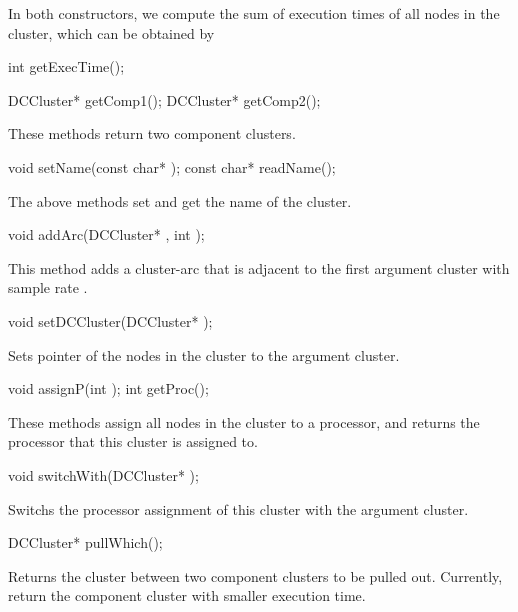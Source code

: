In both constructors, we compute the sum of execution times of all nodes in
the cluster, which can be obtained by

\begin{example}
int getExecTime();
\end{example}

\begin{example}
DCCluster* getComp1();
DCCluster* getComp2();
\end{example}

These methods return two component clusters.

\begin{example}
void setName(const char* );
const char* readName();
\end{example}

The above methods set and get the name of the cluster.

\begin{example}
void addArc(DCCluster* , int );
\end{example}

This method adds a cluster-arc that is adjacent to the first argument cluster
with sample rate .

\begin{example}
void setDCCluster(DCCluster* );
\end{example}

Sets  pointer of the nodes in the cluster to the argument
cluster.

\begin{example}
void assignP(int );
int getProc();
\end{example}

These methods assign all nodes in the cluster to a processor, and returns
the processor that this cluster is assigned to.

\begin{example}
void switchWith(DCCluster* );
\end{example}

Switchs the processor assignment of this cluster with the argument cluster.

\begin{example}
DCCluster* pullWhich();
\end{example}

Returns the cluster between two component clusters to be pulled out. Currently,
return the component cluster with smaller execution time.

